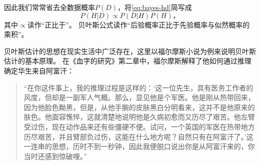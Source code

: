 因此我们常常省去全数据概率$P(D)$，将\cref{eq:bayes-hd}简写成
\begin{equation}\label{eq:bayes-propto}
    P(H|D)\propto P(D|H)P(H)，
\end{equation}
其中$\propto$读作“正比于”。
贝叶斯公式读作“后验概率正比于先验概率与似然概率的乘积”。

贝叶斯估计的思想在现实生活中广泛存在，这里以福尔摩斯小说为例来说明贝叶斯估计的基本原理。
在《血字的研究》第二章中，福尔摩斯解释了他如何通过推理确定华生来自阿富汗：
\begin{quotation}
    \kaishu
    “在你这件事上，我的推理过程是这样的：‘这一位先生，具有医务工作者的风度，但却是一副军人气概。那么，显见他是个军医。他是刚从热带回来，因为他脸色黝黑，但是，从他手腕的皮肤黑白分明看来，这并不是他原来的肤色。他面容憔悴，这就清楚地说明他是久病初愈而又历尽了艰苦。他左臂受过伤，现在动作品来还有些僵硬不便。试问，一个英国的军医在热带地方历尽艰苦，并且臂部负过伤，这能在什么地方呢？自然只有在阿富汗了。’这一连串的思想，历时不到一秒钟，因此我便脱口说出你是从阿富汗来的，你当时还感到惊破哩。”
\end{quotation}

